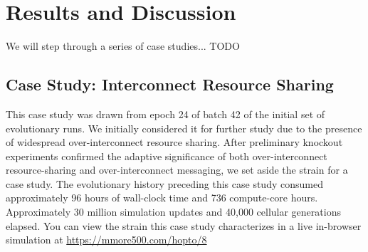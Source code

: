 \section{Results and Discussion} \label{sec:results}









% 

We will step through a series of case studies... TODO

\subsection{Case Study: Interconnect Resource Sharing}



This case study was drawn from epoch 24 of batch 42 of the initial set of evolutionary runs.
We initially considered it for further study due to the presence of widespread over-interconnect resource sharing.
After preliminary knockout experiments confirmed the adaptive significance of both over-interconnect resource-sharing and over-interconnect messaging, we set aside the strain for a case study.
The evolutionary history preceding this case study consumed approximately 96 hours of wall-clock time and 736 compute-core hours.
Approximately 30 million simulation updates and 40,000 cellular generations elapsed.
You can view the strain this case study characterizes in a live in-browser simulation at \url{https://mmore500.com/hopto/8}


